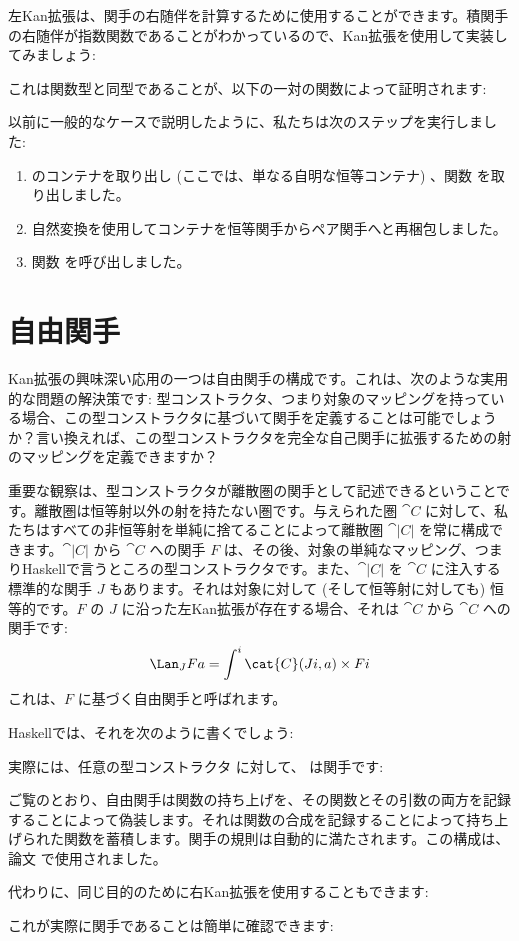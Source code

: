 左Kan拡張は、関手の右随伴を計算するために使用することができます。積関手の右随伴が指数関数であることがわかっているので、Kan拡張を使用して実装してみましょう:

これは関数型と同型であることが、以下の一対の関数によって証明されます:

以前に一般的なケースで説明したように、私たちは次のステップを実行しました:

\begin{enumerate}
  \tightlist
  \item
         のコンテナを取り出し (ここでは、単なる自明な恒等コンテナ) 、関数  を取り出しました。
  \item
        自然変換を使用してコンテナを恒等関手からペア関手へと再梱包しました。
  \item
        関数  を呼び出しました。
\end{enumerate}

\section{自由関手}

Kan拡張の興味深い応用の一つは自由関手の構成です。これは、次のような実用的な問題の解決策です: 型コンストラクタ、つまり対象のマッピングを持っている場合、この型コンストラクタに基づいて関手を定義することは可能でしょうか？言い換えれば、この型コンストラクタを完全な自己関手に拡張するための射のマッピングを定義できますか？

重要な観察は、型コンストラクタが離散圏の関手として記述できるということです。離散圏は恒等射以外の射を持たない圏です。与えられた圏 $\cat{C}$ に対して、私たちはすべての非恒等射を単純に捨てることによって離散圏 $\cat{|C|}$ を常に構成できます。$\cat{|C|}$ から $\cat{C}$ への関手 $F$ は、その後、対象の単純なマッピング、つまりHaskellで言うところの型コンストラクタです。また、$\cat{|C|}$ を $\cat{C}$ に注入する標準的な関手 $J$ もあります。それは対象に対して (そして恒等射に対しても) 恒等的です。$F$ の $J$ に沿った左Kan拡張が存在する場合、それは $\cat{C}$ から $\cat{C}$ への関手です:
\[\Lan_{J}F a = \int^i \cat{C}(J i, a)\times{}F i\]
これは、$F$ に基づく自由関手と呼ばれます。

Haskellでは、それを次のように書くでしょう:

実際には、任意の型コンストラクタ  に対して、 は関手です:

ご覧のとおり、自由関手は関数の持ち上げを、その関数とその引数の両方を記録することによって偽装します。それは関数の合成を記録することによって持ち上げられた関数を蓄積します。関手の規則は自動的に満たされます。この構成は、論文  で使用されました。

代わりに、同じ目的のために右Kan拡張を使用することもできます:

これが実際に関手であることは簡単に確認できます:




